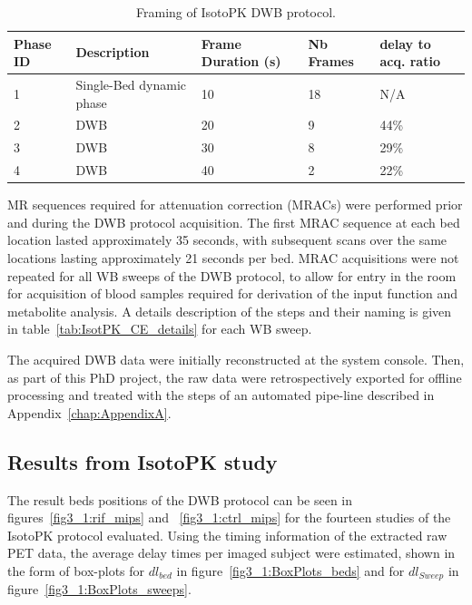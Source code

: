 \begin{table}[]
\caption{Framing of IsotoPK DWB protocol.}
\label{tab:IsotoPK_Framing}
\begin{tabular}{|l|l|l|l|l|}
\toprule
\textbf{Phase ID} & \textbf{Description}              & \textbf{Frame Duration (s)} & \textbf{Nb Frames} & \textbf{delay to acq. ratio} \\
\midrule
1        & Single-Bed dynamic phase & 10                 & 18        & N/A                 \\
2        & DWB                      & 20                 & 9         & 44\%                \\
3        & DWB                      & 30                 & 8         & 29\%                \\
4        & DWB                      & 40                 & 2         & 22\%                \\
\bottomrule
\end{tabular}
\end{table}

MR sequences required for attenuation correction (MRACs) were performed prior and during the DWB protocol acquisition. The first MRAC sequence at each bed location lasted approximately 35 seconds, with subsequent scans over the same locations lasting approximately 21 seconds per bed. MRAC acquisitions were not repeated for all WB sweeps of the DWB protocol, to allow for entry in the room for acquisition of blood samples required for derivation of the input function and metabolite analysis. 
A details description of the steps and their naming is given in table~\ref{tab:IsotPK_CE_details} for each WB sweep. %

The acquired DWB data were initially reconstructed at the system console.
Then, as part of this PhD project, the raw data were retrospectively exported for offline processing and treated with the steps of an automated pipe-line described in Appendix~\ref{chap:AppendixA}.

\subsection{Results from IsotoPK study}

The result beds positions of the DWB protocol can be seen in figures~\ref{fig3_1:rif_mips} and ~\ref{fig3_1:ctrl_mips} for the fourteen studies of the IsotoPK protocol evaluated.
Using the timing information of the extracted raw PET data, the average delay times per imaged subject were estimated, shown in the form of box-plots for $dl_{bed}$ in figure~\ref{fig3_1:BoxPlots_beds} and for $dl_{Sweep}$ in figure~\ref{fig3_1:BoxPlots_sweeps}.

